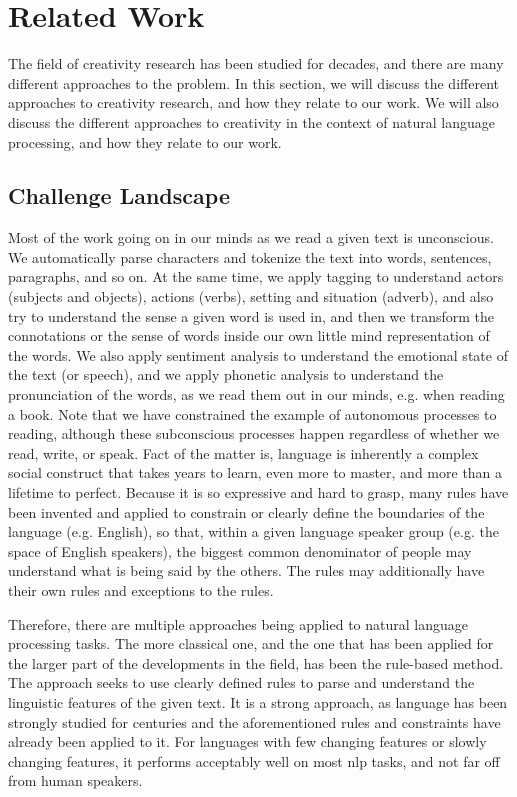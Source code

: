 \chapter{Related Work}
\label{chap:background}
The field of creativity research has been studied for decades, and there are many different approaches to the problem. In this section, we will discuss the different approaches to creativity research, and how they relate to our work. We will also discuss the different approaches to creativity in the context of natural language processing, and how they relate to our work.

\section{Challenge Landscape}
\label{sec:challenge_landscape}
Most of the work going on in our minds as we read a given text is unconscious. We automatically parse characters and tokenize the text into words, sentences, paragraphs, and so on. At the same time, we apply tagging to understand actors (subjects and objects), actions (verbs), setting and situation (adverb), and also try to understand the sense a given word is used in, and then we transform the connotations or the sense of words inside our own little mind representation of the words. We also apply sentiment analysis to understand the emotional state of the text (or speech), and we apply phonetic analysis to understand the pronunciation of the words, as we read them out in our minds, e.g. when reading a book. Note that we have constrained the example of autonomous processes to reading, although these subconscious processes happen regardless of whether we read, write, or speak. Fact of the matter is, language is inherently a complex social construct that takes years to learn, even more to master, and more than a lifetime to perfect. Because it is so expressive and hard to grasp, many rules have been invented and applied to constrain or clearly define the boundaries of the language (e.g. English), so that, within a given language speaker group (e.g. the space of English speakers), the biggest common denominator of people may understand what is being said by the others. The rules may additionally have their own rules and exceptions to the rules. 


Therefore, there are multiple approaches being applied to natural language processing tasks. The more classical one, and the one that has been applied for the larger part of the developments in the field, has been the rule-based method. The approach seeks to use clearly defined rules to parse and understand the linguistic features of the given text. It is a strong approach, as language has been strongly studied for centuries and the aforementioned rules and constraints have already been applied to it. For languages with few changing features or slowly changing features, it performs acceptably well on most \acrfull{nlp} tasks, and not far off from human speakers. 

